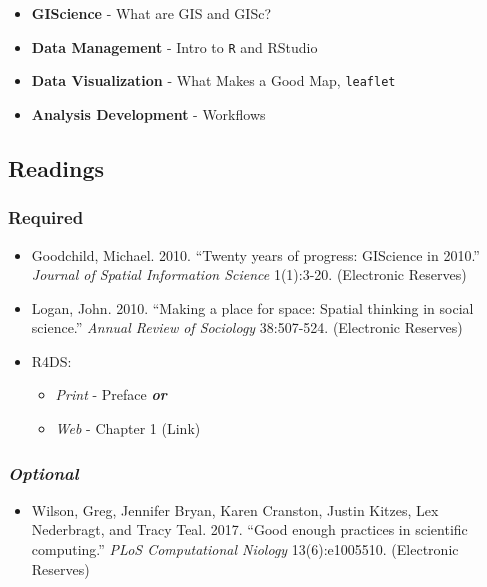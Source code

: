 \documentclass[]{book}
\providecommand{\tightlist}{%
  \setlength{\itemsep}{0pt}\setlength{\parskip}{0pt}}
\begin{document}
\begin{itemize}
\tightlist
\item
  \textbf{GIScience} - What are GIS and GISc?
\item
  \textbf{Data Management} - Intro to \texttt{R} and RStudio
\item
  \textbf{Data Visualization} - What Makes a Good Map, \texttt{leaflet}
\item
  \textbf{Analysis Development} - Workflows
\end{itemize}

\hypertarget{readings-2}{%
\subsection*{Readings}\label{readings-2}}

\hypertarget{required-2}{%
\subsubsection*{Required}\label{required-2}}

\begin{itemize}
\tightlist
\item
  Goodchild, Michael. 2010. ``Twenty years of progress: GIScience in 2010.'' \emph{Journal of Spatial Information Science} 1(1):3-20. (Electronic Reserves)
\item
  Logan, John. 2010. ``Making a place for space: Spatial thinking in social science.'' \emph{Annual Review of Sociology} 38:507-524. (Electronic Reserves)
\item
  R4DS:

  \begin{itemize}
  \tightlist
  \item
    \emph{Print} - Preface \textbf{\emph{or}}
  \item
    \emph{Web} - Chapter 1 (Link)
  \end{itemize}
\end{itemize}

\hypertarget{optional-1}{%
\subsubsection*{\texorpdfstring{\emph{Optional}}{Optional}}\label{optional-1}}

\begin{itemize}
\tightlist
\item
  Wilson, Greg, Jennifer Bryan, Karen Cranston, Justin Kitzes, Lex Nederbragt, and Tracy Teal. 2017. ``Good enough practices in scientific computing.'' \emph{PLoS Computational Niology} 13(6):e1005510. (Electronic Reserves)
\end{itemize}
\end{document}
